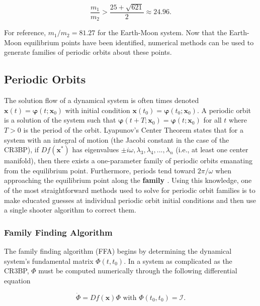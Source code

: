 \documentclass[11pt]{article} %
\begin{document}
\begin{equation}
	\frac{m_1}{m_2} > \frac{25+\sqrt{621}}{2}\approx24.96.
\end{equation}

\noindent
For reference, $m_1/m_2=81.27$ for the Earth-Moon system. Now that the Earth-Moon equilibrium points have been identified, numerical methods can be used to generate families of periodic orbits about these points.

\subsection{Periodic Orbits}
The solution flow of a dynamical system is often times denoted $\bm{x}\left(t\right)=\bm{\varphi}\left(t;\bm{x}_0\right)$ with initial condition $\bm{x}\left(t_0\right)=\bm{\varphi}\left(t_0;\bm{x}_0\right)$. A periodic orbit is a solution of the system such that $\bm{\varphi}\left(t+T;\bm{x}_0\right) = \bm{\varphi}\left(t;\bm{x}_0\right)$ for all $t$ where $T>0$ is the period of the orbit. Lyapunov's Center Theorem states that for a system with an integral of motion (the Jacobi constant in the case of the CR3BP), if $Df\left(\bm{x}^*\right)$ has eigenvalues $\pm i\omega, \lambda_3, \lambda_4,...,\lambda_n$ (i.e., at least one center manifold), then there exists a one-parameter family of periodic orbits emanating from the equilibrium point. Furthermore, periods tend toward $2\pi/\omega$ when approaching the equilibrium point along the \textbf{family \cite{MeyerandHallBook}}. Using this knowledge, one of the most straightforward methods used to solve for periodic orbit families is to make educated guesses at individual periodic orbit initial conditions and then use a single shooter algorithm to correct them. 

\subsubsection{Family Finding Algorithm}
The family finding algorithm (FFA) begins by determining the dynamical system's fundamental matrix $\Phi\left(t,t_0\right)$. In a system as complicated as the CR3BP, $\Phi$ must be computed numerically through the following differential equation

\begin{equation}
	\dot{\Phi}=Df\left(\bm{x}\right)\Phi \text{ with } \Phi\left(t_0,t_0\right)=\mathcal{I}.
\end{equation}
\end{document}
